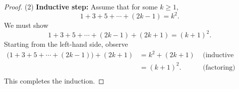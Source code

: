 \documentclass[11pt]{report}
\theoremstyle{plain}
\begin{document}
\begin{enumerate}
\begin{proof}
\medskip\noindent(2) \textbf{Inductive step:}
Assume that for some $k\geq 1$,
\[
  1+ 3+5+\cdots+(2k-1)=k^2.
\]
We must show 
\[
  1+3+5+\cdots+(2k-1)+(2k+1)=(k+1)^2.
\]
Starting from the left-hand side, observe
\hspace*{-.3in}\begin{align*}
  \big(1+ 3+5+\cdots+(2k-1)\big)+(2k+1)
  &= k^2+(2k+1)&\text{ (inductive hypothesis)}\\
  &= (k+1)^2.& \text{ (factoring)}\\
\end{align*}
This completes the induction.
\end{proof}
\end{enumerate}
\end{document}
